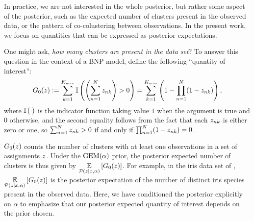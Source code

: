 In practice, we are not interested in the whole posterior, but rather some
aspect of the posterior, such as the expected number of clusters present in the
observed data, or the pattern of co-colustering between observations. In the
present work, we focus on quantities that can be expressed as posterior
expectations.


\begin{ex}

One might ask, \textit{how many clusters are present in the data set}? To answer
this question in the context of a BNP model, define the
following ``quantity of interest'':
%
\begin{align*}
  G_0(z) := \sum_{k=1}^{K_{\mathrm{max}}} \mathbb{I}\left( \left(\sum_{n=1}^{N}
  z_{nk}\right) > 0\right)
  = \sum_{k=1}^{{K_{\mathrm{max}}}} \left(1 -  \prod_{n=1}^N (1 - z_{nk})\right),
\end{align*}
%
where $\mathbb{I}\left(\cdot\right)$ is the indicator function taking value $1$ when the argument
is true and $0$ otherwise, and the second equality follows from the fact that
each $z_{nk}$ is either zero or one, so $\sum_{n=1}^N z_{nk} > 0$ if and
only if $\prod_{n=1}^N (1 - z_{nk}) = 0$.

$G_0(z)$ counts the number of clusters with at least one observations
in a set of assignments $z$.  Under the $\mathrm{GEM}(\alpha)$ prior, the posterior expected
number of clusters is thus given by
$\underset{\mathcal{P}(z\vert x,\alpha)}{\mathbb{E}}\left[G_0(z)\right]$. For example, in the iris data
set of ,
$\underset{\mathcal{P}(z\vert x,\alpha)}{\mathbb{E}}\left[G_0(z)\right]$ is the posterior expectation
of the number of distinct iris species present in the observed data.  Here, we
have conditioned the posterior explicitly on $\alpha$ to emphasize that our
posterior expected quantity of interest depends on the prior chosen.
%
\end{ex}

